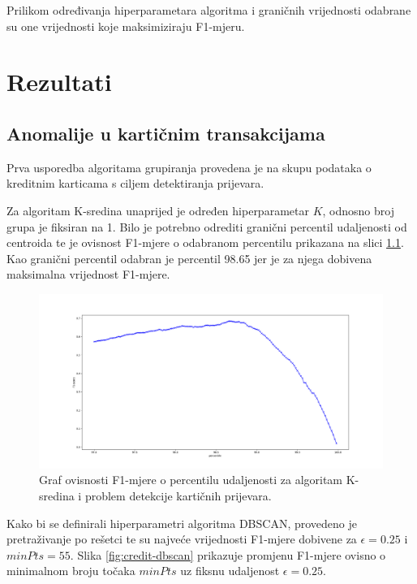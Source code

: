 \documentclass[utf8, diplomski, numeric]{fer}
\begin{document}
Prilikom određivanja hiperparametara algoritma i graničnih vrijednosti odabrane su one vrijednosti koje maksimiziraju F1-mjeru.


\chapter{Rezultati}

\section{Anomalije u kartičnim transakcijama}
Prva usporedba algoritama grupiranja provedena je na skupu podataka o kreditnim karticama s ciljem detektiranja prijevara.

Za algoritam K-sredina unaprijed je određen hiperparametar $K$, odnosno broj grupa je fiksiran na 1. Bilo je potrebno odrediti granični percentil udaljenosti od centroida te je ovisnost F1-mjere o odabranom percentilu prikazana na slici \ref{fig:credit-kmeans}. Kao granični percentil odabran je percentil 98.65 jer je za njega dobivena maksimalna vrijednost F1-mjere.

\begin{figure}[h!]
\includegraphics[width=1\textwidth]{images/credit-kmeans-f1.png}
\centering
\caption{Graf ovisnosti F1-mjere o percentilu udaljenosti za algoritam K-sredina i problem detekcije kartičnih prijevara.}
\label{fig:credit-kmeans}
\end{figure}

Kako bi se definirali hiperparametri algoritma DBSCAN, provedeno je pretraživanje po rešetci te su najveće vrijednosti F1-mjere dobivene za $\epsilon = 0.25$ i $minPts = 55$. Slika \ref{fig:credit-dbscan} prikazuje promjenu F1-mjere ovisno o minimalnom broju točaka $minPts$ uz fiksnu udaljenost $\epsilon = 0.25$.
\end{document}
